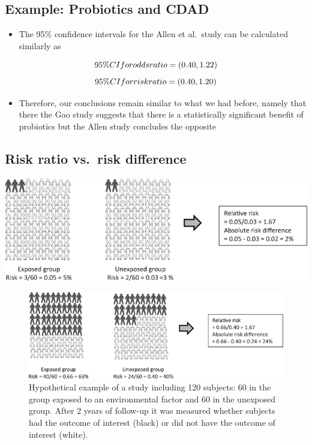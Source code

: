 \documentclass[
]{book}
\providecommand{\tightlist}{%
  \setlength{\itemsep}{0pt}\setlength{\parskip}{0pt}}
\begin{document}
\hypertarget{example-probiotics-and-cdad-1}{%
\subsection{Example: Probiotics and CDAD}\label{example-probiotics-and-cdad-1}}

\begin{itemize}
\tightlist
\item
  The 95\% confidence intervals for the Allen et al.~study can be calculated similarly as
\end{itemize}

\[95\%\space CI\space for\space odds\space ratio = (0.40, 1.22)\]
\[95\%\space CI\space for\space risk\space ratio = (0.40, 1.20)\]

\begin{itemize}
\tightlist
\item
  Therefore, our conclusions remain similar to what we had before, namely that there the Gao study suggests that there is a statistically significant benefit of probiotics but the Allen study concludes the opposite
\end{itemize}

\hypertarget{risk-ratio-vs.-risk-difference}{%
\subsection{Risk ratio vs.~risk difference}\label{risk-ratio-vs.-risk-difference}}

\includegraphics[width=1\linewidth]{./8_16}

\begin{figure}
\includegraphics[width=1\linewidth]{./8_17} \caption{Hypothetical example of a study including 120 subjects: 60 in the group exposed to an environmental factor and 60 in the unexposed group. After 2 years of follow-up it was measured whether subjects had the outcome of interest (black) or did not have the outcome of interest (white).}\label{fig:unnamed-chunk-78}
\end{figure}
\end{document}
